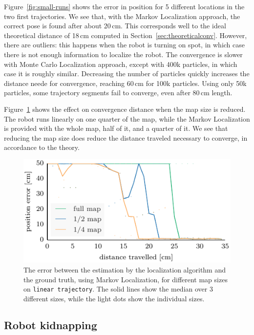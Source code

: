 \documentclass[letterpaper, 10pt, conference]{ieeeconf}
\newcommand{\Fig}[1]{Figure~\ref{fig:#1}}
\newcommand{\sect}[1]{Section~\ref{sec:#1}}
\begin{document}
\Fig{small-runs} shows the error in position for 5 different locations in the two first trajectories.
We see that, with the Markov Localization approach, the correct pose is found after about 20\,cm.
This corresponds well to the ideal theoretical distance of 18\,cm computed in \sect{theoreticalconv}.
However, there are outliers: this happens when the robot is turning on spot, in which case there is not enough information to localize the robot.
The convergence is slower with Monte Carlo Localization approach, except with 400k particles, in which case it is roughly similar.
Decreasing the number of particles quickly increases the distance neede for convergence, reaching 60\,cm for 100k particles.
Using only 50k particles, some trajectory segments fail to converge, even after 80\,cm length.

\Fig{small-maps} shows the effect on convergence distance when the map size is reduced.
The robot runs linearly on one quarter of the map, while the Markov Localization is provided with the whole map, half of it, and a quarter of it.
We see that reducing the map size does reduce the distance traveled necessary to converge, in accordance to the theory.

\begin{figure}
\includegraphics{ml-small_maps-xy}
\caption{The error between the estimation by the localization algorithm and the ground truth, using Markov Localization, for different map sizes on \texttt{linear trajectory}.
The solid lines show the median over 3 different sizes, while the light dots show the individual sizes.}
\label{fig:small-maps}
\end{figure}

\subsection{Robot kidnapping}
\end{document}
